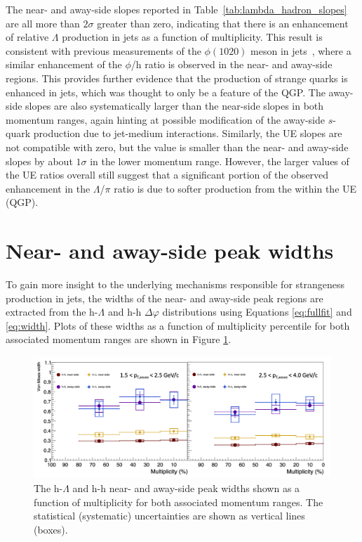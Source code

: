 The near- and away-side slopes reported in Table~\ref{tab:lambda_hadron_slopes} are all more than $2\sigma$ greater than zero, indicating that there is an enhancement of relative $\Lambda$ production in jets as a function of multiplicity. This result is consistent with previous measurements of the $\phi(1020)$ meson in jets~\cite{JustinPaper}, where a similar enhancement of the $\phi$/h ratio is observed in the near- and away-side regions. This provides further evidence that the production of strange quarks is enhanced in jets, which was thought to only be a feature of the QGP. The away-side slopes are also systematically larger than the near-side slopes in both momentum ranges, again hinting at possible modification of the away-side $s$-quark production due to jet-medium interactions. Similarly, the UE slopes are not compatible with zero, but the value is smaller than the near- and away-side slopes by about $1\sigma$ in the lower momentum range. However, the larger values of the UE ratios overall still suggest that a significant portion of the observed enhancement in the $\Lambda$/$\pi$ ratio is due to softer production from the within the UE (QGP).


\section{Near- and away-side peak widths}
\label{sec:jet_widths}

To gain more insight to the underlying mechanisms responsible for strangeness production in jets, the widths of the near- and away-side peak regions are extracted from the h-$\Lambda$ and h-h $\Delta\varphi$ distributions using Equations \ref{eq:fullfit} and \ref{eq:width}. Plots of these widths as a function of multiplicity percentile for both associated momentum ranges are shown in Figure \ref{fig:jet_widths}.

\begin{figure}[h!]
\centering
\includegraphics[width=\textwidth]{figures/results/widths_plot.png}
\caption{The h-$\Lambda$ and h-h near- and away-side peak widths shown as a function of multiplicity for both associated momentum ranges.  The statistical (systematic) uncertainties are shown as vertical lines (boxes).}
\label{fig:jet_widths}
\end{figure}

